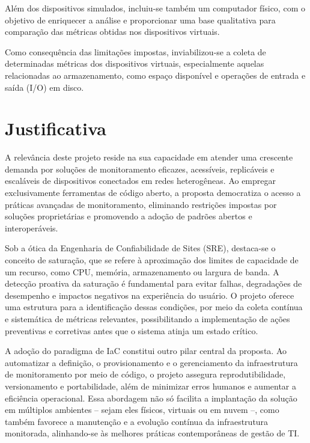 Além dos dispositivos simulados, incluiu-se também um computador físico, com o objetivo de enriquecer a análise e proporcionar uma base qualitativa para comparação das métricas obtidas nos dispositivos virtuais.

Como consequência das limitações impostas, inviabilizou-se a coleta de determinadas métricas dos dispositivos virtuais, especialmente aquelas relacionadas ao armazenamento, como espaço disponível e operações de entrada e saída (I/O) em disco.

\section{Justificativa}

A relevância deste projeto reside na sua capacidade em atender uma crescente demanda por soluções de monitoramento eficazes, acessíveis, replicáveis e escaláveis de dispositivos conectados em redes heterogêneas. Ao empregar exclusivamente ferramentas de código aberto, a proposta democratiza o acesso a práticas avançadas de monitoramento, eliminando restrições impostas por soluções proprietárias e promovendo a adoção de padrões abertos e interoperáveis.

Sob a ótica da Engenharia de Confiabilidade de Sites (SRE), destaca-se o conceito de saturação, que se refere à aproximação dos limites de capacidade de um recurso, como CPU, memória, armazenamento ou largura de banda.  A detecção proativa da saturação é fundamental para evitar falhas, degradações de desempenho e impactos negativos na experiência do usuário. O projeto oferece uma estrutura para a identificação dessas condições, por meio da coleta contínua e sistemática de métricas relevantes, possibilitando a implementação de ações preventivas e corretivas antes que o sistema atinja um estado crítico.

A adoção do paradigma de IaC constitui outro pilar central da proposta. Ao automatizar a definição, o provisionamento e o gerenciamento da infraestrutura de monitoramento por meio de código, o projeto assegura reprodutibilidade, versionamento e portabilidade, além de minimizar erros humanos e aumentar a eficiência operacional. Essa abordagem não só facilita a implantação da solução em múltiplos ambientes -- sejam eles físicos, virtuais ou em nuvem --, como também favorece a manutenção e a evolução contínua da infraestrutura monitorada, alinhando-se às melhores práticas contemporâneas de gestão de TI.


